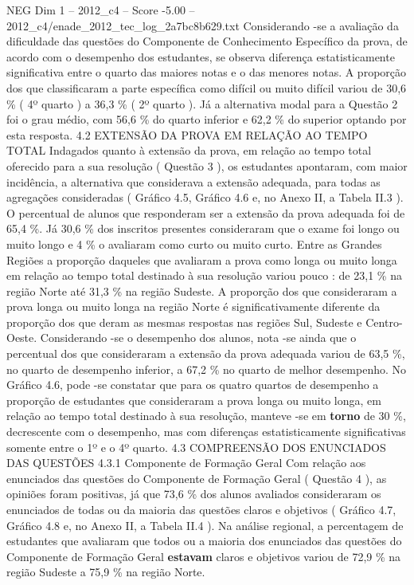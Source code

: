 \begin{textsample}{NEG Dim 1 – 2012\_c4 – Score -5.00 – 2012\_c4/enade\_2012\_tec\_log\_2a7bc8b629.txt}
Considerando -se a avaliação da dificuldade das questões do Componente de Conhecimento Específico da prova, de acordo com o desempenho dos estudantes, se observa diferença estatisticamente significativa entre o quarto das maiores notas e o das menores notas.
A proporção dos que classificaram a parte específica como difícil ou muito difícil variou de 30,6 \% ( 4º quarto ) a 36,3 \% ( 2º quarto ).
Já a alternativa modal para a Questão 2 foi o grau médio, com 56,6 \% do quarto inferior e 62,2 \% do superior optando por esta resposta. 4.2 EXTENSÃO DA PROVA EM RELAÇÃO AO TEMPO TOTAL Indagados quanto à extensão da prova, em relação ao tempo total oferecido para a sua resolução ( Questão 3 ), os estudantes apontaram, com maior incidência, a alternativa que considerava a extensão adequada, para todas as agregações consideradas ( Gráfico 4.5, Gráfico 4.6 e, no Anexo II, a Tabela II.3 ).
O percentual de alunos que responderam ser a extensão da prova adequada foi de 65,4 \%.
Já 30,6 \% dos inscritos presentes consideraram que o exame foi longo ou muito longo e 4 \% o avaliaram como curto ou muito curto.
Entre as Grandes Regiões a proporção daqueles que avaliaram a prova como longa ou muito longa em relação ao tempo total destinado à sua resolução variou pouco : de 23,1 \% na região Norte até 31,3 \% na região Sudeste.
A proporção dos que consideraram a prova longa ou muito longa na região Norte é significativamente diferente da proporção dos que deram as mesmas respostas nas regiões Sul, Sudeste e Centro-Oeste.
Considerando -se o desempenho dos alunos, nota -se ainda que o percentual dos que consideraram a extensão da prova adequada variou de 63,5 \%, no quarto de desempenho inferior, a 67,2 \% no quarto de melhor desempenho.
No Gráfico 4.6, pode -se constatar que para os quatro quartos de desempenho a proporção de estudantes que consideraram a prova longa ou muito longa, em relação ao tempo total destinado à sua resolução, manteve -se em \textbf{torno} de 30 \%, decrescente com o desempenho, mas com diferenças estatisticamente significativas somente entre o 1º e o 4º quarto. 4.3 COMPREENSÃO DOS ENUNCIADOS DAS QUESTÕES 4.3.1 Componente de Formação Geral Com relação aos enunciados das questões do Componente de Formação Geral ( Questão 4 ), as opiniões foram positivas, já que 73,6 \% dos alunos avaliados consideraram os enunciados de todas ou da maioria das questões claros e objetivos ( Gráfico 4.7, Gráfico 4.8 e, no Anexo II, a Tabela II.4 ).
Na análise regional, a percentagem de estudantes que avaliaram que todos ou a maioria dos enunciados das questões do Componente de Formação Geral \textbf{estavam} claros e objetivos variou de 72,9 \% na região Sudeste a 75,9 \% na região Norte.

\end{textsample}
